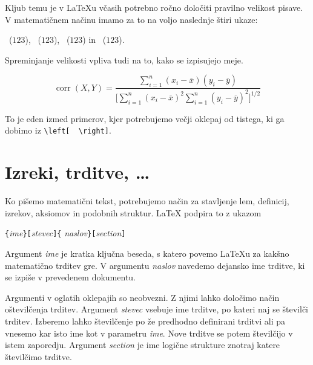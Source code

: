 Kljub temu je v \LaTeX{}u včasih potrebno ročno določiti pravilno velikost 
pisave. V matematičnem načinu imamo za to na voljo naslednje štiri ukaze:
\begin{flushleft}
~($\displaystyle 123$),
 ~($\textstyle 123$), 
~($\scriptstyle 123$) in
~($\scriptscriptstyle 123$).
\end{flushleft}

Spreminjanje velikosti vpliva tudi na to, kako se izpisujejo meje.
\begin{example}
\begin{displaymath}
\mathop{\mathrm{corr}}(X,Y)= 
 \frac{\displaystyle 
   \sum_{i=1}^n(x_i-\overline x)
   (y_i-\overline y)} 
  {\displaystyle\biggl[
 \sum_{i=1}^n(x_i-\overline x)^2
\sum_{i=1}^n(y_i-\overline y)^2
\biggr]^{1/2}}
\end{displaymath}    
\end{example}

\noindent To je eden izmed primerov, kjer potrebujemo večji 
oklepaj od tistega, ki ga dobimo iz \verb|\left[  \right]|.


\section{Izreki, trditve, \ldots}

Ko pišemo matematični tekst, potrebujemo način za stavljenje 
 lem, definicij, izrekov, aksiomov in podobnih struktur. 
 \LaTeX{} podpira to z ukazom
\begin{lscommand}
\verb|{|\emph{ime}\verb|}[|\emph{stevec}\verb|]{|%
         \emph{naslov}\verb|}[|\emph{section}\verb|]|
\end{lscommand}
Argument \emph{ime} je kratka ključna beseda, s katero povemo \LaTeX{}u za kakšno matematično trditev gre.
V argumentu \emph{naslov} navedemo dejansko ime trditve, ki se izpiše v prevedenem dokumentu.

Argumenti v oglatih oklepajih so neobvezni. Z njimi lahko določimo način oštevilčenja trditev. 
Argument \emph{stevec} vsebuje ime trditve, po kateri naj se številči trditev. 
Izberemo lahko številčenje po že predhodno definirani trditvi ali pa vnesemo kar isto 
ime kot v parametru \emph{ime}. 
Nove trditve se potem številčijo v istem zaporedju. Argument \emph{section} je ime logične strukture
znotraj katere številčimo trditve.

